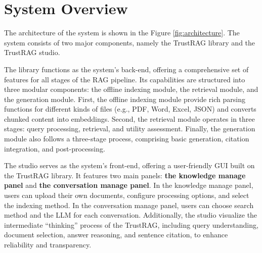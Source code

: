 

\section{System Overview}
The architecture of the system is shown in the Figure \ref{fig:architecture}. The system consists of two major components, namely the TrustRAG library and the TrustRAG studio. 

The library functions as the system's back-end, offering a comprehensive set of features for all stages of the \ac{RAG} pipeline. Its capabilities are structured into three modular components: the offline indexing module, the retrieval module, and the generation module.
First, the offline indexing module provide rich parsing functions for different kinds of files (e.g., PDF, Word, Excel, JSON) and converts chunked content into embeddings. 
Second, the retrieval module operates in three stages: query processing, retrieval, and utility assessment. 
Finally, the generation module also follows a three-stage process, comprising basic generation, citation integration, and post-processing.

The studio serves as the system's front-end, offering a user-friendly GUI built on the TrustRAG library. It features two main panels: \textbf{the knowledge manage panel} and \textbf{the conversation manage panel}. In the knowledge manage panel, users can upload their own documents, configure processing options, and select the indexing method. In the conversation manage panel, users can choose search method and the \ac{LLM} for each conversation. Additionally, the studio visualize the intermediate ``thinking'' process of the TrustRAG, including query understanding, document selection, answer reasoning, and sentence citation, to enhance reliability and transparency. 








 
 

